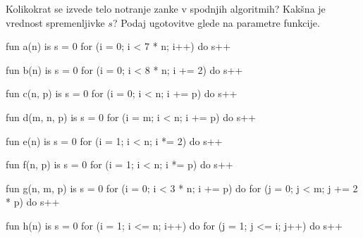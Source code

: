 \begin{Exercise}
Kolikokrat se izvede telo notranje zanke v spodnjih algoritmih? Kakšna je vrednost spremenljivke $s$? Podaj ugotovitve glede na parametre funkcije.\\
\begin{minipage}{0.5\textwidth}
\begin{rox}
fun a(n) is
	s = 0
	for (i = 0; i < 7 * n; i++) do
		s++
\end{rox}
\end{minipage}
%
\begin{minipage}{0.5\textwidth}
\begin{rox}
fun b(n) is
	s = 0
	for (i = 0; i < 8 * n; i += 2) do
		s++
\end{rox}
\end{minipage}
%
\begin{minipage}{0.5\textwidth}
\begin{rox}
fun c(n, p) is
	s = 0
	for (i = 0; i < n; i += p) do
		s++
\end{rox}
\end{minipage}
%
\begin{minipage}{0.5\textwidth}
\begin{rox}
fun d(m, n, p) is
	s = 0
	for (i = m; i < n; i += p) do
		s++
\end{rox}
\end{minipage}
%
\begin{minipage}{0.5\textwidth}
\begin{rox}
fun e(n) is
	s = 0
	for (i = 1; i < n; i *= 2) do
		s++
\end{rox}
\end{minipage}
%
\begin{minipage}{0.5\textwidth}
\begin{rox}
fun f(n, p) is
	s = 0
	for (i = 1; i < n; i *= p) do
		s++
\end{rox}
\end{minipage}
%
\begin{minipage}{0.5\textwidth}
\begin{rox}
fun g(n, m, p) is
	s = 0
	for (i = 0; i < 3 * n; i += p) do
		for (j = 0; j < m; j += 2 * p) do
			s++
\end{rox}
\end{minipage}
%
\begin{minipage}{0.5\textwidth}
\begin{rox}
fun h(n) is
	s = 0
	for (i = 1; i <= n; i++) do
		for (j = 1; j <= i; j++) do
			s++
\end{rox}
\end{minipage}
\end{Exercise}


